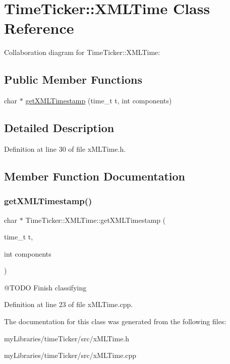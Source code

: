 \hypertarget{classTimeTicker_1_1XMLTime}{}\section{Time\+Ticker\+::X\+M\+L\+Time Class Reference}
\label{classTimeTicker_1_1XMLTime}


Collaboration diagram for Time\+Ticker\+::X\+M\+L\+Time\+:
\subsection*{Public Member Functions}
\begin{DoxyCompactItemize}
\item 
char $\ast$ \mbox{\hyperlink{classTimeTicker_1_1XMLTime_a0dfaf08829fd008bb86bde06d251b38b}{get\+X\+M\+L\+Timestamp}} (time\+\_\+t t, int components)
\end{DoxyCompactItemize}


\subsection{Detailed Description}


Definition at line 30 of file x\+M\+L\+Time.\+h.



\subsection{Member Function Documentation}
\mbox{\label{classTimeTicker_1_1XMLTime_a0dfaf08829fd008bb86bde06d251b38b}} 
\subsubsection{\texorpdfstring{getXMLTimestamp()}{getXMLTimestamp()}}
{\footnotesize\ttfamily char $\ast$ Time\+Ticker\+::\+X\+M\+L\+Time\+::get\+X\+M\+L\+Timestamp (\begin{DoxyParamCaption}\item[{time\+\_\+t}]{t,  }\item[{int}]{components }\end{DoxyParamCaption})}

@\+T\+O\+DO Finish classifying 

Definition at line 23 of file x\+M\+L\+Time.\+cpp.



The documentation for this class was generated from the following files\+:\begin{DoxyCompactItemize}
\item 
my\+Libraries/time\+Ticker/src/x\+M\+L\+Time.\+h\item 
my\+Libraries/time\+Ticker/src/x\+M\+L\+Time.\+cpp\end{DoxyCompactItemize}
